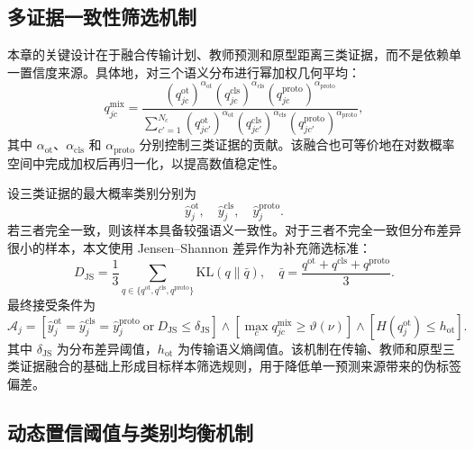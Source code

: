 \documentclass{seuthesis-2022}
\begin{document}
\subsection{多证据一致性筛选机制}

本章的关键设计在于融合传输计划、教师预测和原型距离三类证据，而不是依赖单一置信度来源。具体地，对三个语义分布进行幂加权几何平均：
\begin{equation}
    q_{jc}^{\mathrm{mix}}
    =
    \frac{
    (q_{jc}^{\mathrm{ot}})^{\alpha_{\mathrm{ot}}}
    (q_{jc}^{\mathrm{cls}})^{\alpha_{\mathrm{cls}}}
    (q_{jc}^{\mathrm{proto}})^{\alpha_{\mathrm{proto}}}
    }{
    \sum_{c'=1}^{N_c}
    (q_{jc'}^{\mathrm{ot}})^{\alpha_{\mathrm{ot}}}
    (q_{jc'}^{\mathrm{cls}})^{\alpha_{\mathrm{cls}}}
    (q_{jc'}^{\mathrm{proto}})^{\alpha_{\mathrm{proto}}}
    },
\end{equation}
其中 $\alpha_{\mathrm{ot}}$、$\alpha_{\mathrm{cls}}$ 和 $\alpha_{\mathrm{proto}}$ 分别控制三类证据的贡献。该融合也可等价地在对数概率空间中完成加权后再归一化，以提高数值稳定性。

设三类证据的最大概率类别分别为
\begin{equation}
    \hat{y}_j^{\mathrm{ot}},
    \quad
    \hat{y}_j^{\mathrm{cls}},
    \quad
    \hat{y}_j^{\mathrm{proto}}.
\end{equation}
若三者完全一致，则该样本具备较强语义一致性。对于三者不完全一致但分布差异很小的样本，本文使用 Jensen--Shannon 差异作为补充筛选标准：
\begin{equation}
    D_{\mathrm{JS}}
    =
    \frac{1}{3}
    \sum_{q\in\{q^{\mathrm{ot}},q^{\mathrm{cls}},q^{\mathrm{proto}}\}}
    \mathrm{KL}(q\|\bar{q}),
    \quad
    \bar{q}=
    \frac{
    q^{\mathrm{ot}}+q^{\mathrm{cls}}+q^{\mathrm{proto}}
    }{3}.
\end{equation}
最终接受条件为
\begin{equation}
    \mathcal{A}_j
    =
    \left[
    \hat{y}_j^{\mathrm{ot}}=\hat{y}_j^{\mathrm{cls}}=\hat{y}_j^{\mathrm{proto}}
    \ \mathrm{or}\
    D_{\mathrm{JS}}\leq \delta_{\mathrm{JS}}
    \right]
    \land
    \left[
    \max_c q_{jc}^{\mathrm{mix}}\geq \vartheta(\nu)
    \right]
    \land
    \left[
    H(q_j^{\mathrm{ot}})\leq h_{\mathrm{ot}}
    \right].
\end{equation}
其中 $\delta_{\mathrm{JS}}$ 为分布差异阈值，$h_{\mathrm{ot}}$ 为传输语义熵阈值。该机制在传输、教师和原型三类证据融合的基础上形成目标样本筛选规则，用于降低单一预测来源带来的伪标签偏差。

\subsection{动态置信阈值与类别均衡机制}
\end{document}
